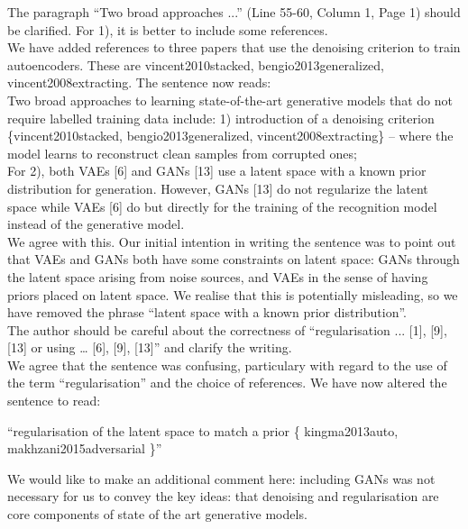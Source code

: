 \documentclass{article}
\begin{document}
{\color{blue}
The paragraph ``Two broad approaches ...'' (Line 55-60, Column 1, Page 1) should be clarified. For 1), it is better to include some references. }  \\

We have added references to three papers that use the denoising criterion to train autoencoders.
These are {\color{red} vincent2010stacked, bengio2013generalized, vincent2008extracting}.  The sentence now reads:\\

{\color{red} Two broad approaches to learning state-of-the-art generative models that do not require labelled training data include: 1) introduction of a denoising criterion \{vincent2010stacked, bengio2013generalized,  vincent2008extracting\} -- where the model learns to reconstruct clean samples from corrupted ones;}\\

{\color{blue} For 2), both VAEs [6] and GANs [13] use a latent space with a known prior distribution for generation. However, GANs [13] do not regularize the latent space while VAEs [6] do but directly for the training of the recognition model instead of the generative model.}\\

We agree with this. Our initial intention in writing the sentence was to point out that VAEs and GANs both have some constraints on latent space: GANs through the latent space arising from noise sources, and VAEs in the sense of having priors placed on latent space. We realise that this is potentially misleading, so we have removed the phrase ``latent space with a {\color{red} known} prior distribution''. \\

{\color{blue} The author should be careful about the correctness of ``regularisation ... [1], [9], [13] or using … [6], [9], [13]'' and clarify the writing.} \\

We agree that the sentence was confusing, particulary with regard to the use of the term ``regularisation'' and the choice of references. We have now altered the sentence to read:

``regularisation of the latent space to match a prior {\color{red} \{ kingma2013auto, makhzani2015adversarial \}}''

We would like to make an additional comment here: including GANs was not necessary for us to convey the key ideas: that denoising and regularisation are core components of state of the art generative models. \\
\end{document}
